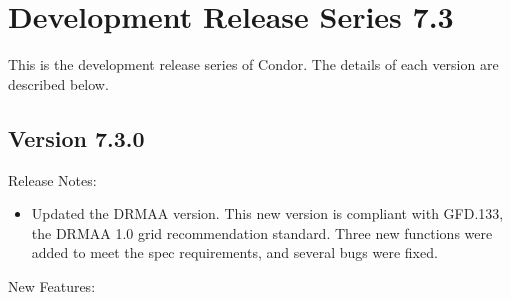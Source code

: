 
\section{\label{sec:History-7-3}Development Release Series 7.3}

This is the development release series of Condor.
The details of each version are described below.


\subsection*{\label{sec:New-7-3-0}Version 7.3.0}

\noindent Release Notes:

\begin{itemize}

\item Updated the DRMAA version.  This new version is compliant with GFD.133, the DRMAA 1.0 grid recommendation standard.  Three new functions were added to meet the spec requirements, and several bugs were fixed.

\end{itemize}


\noindent New Features:

